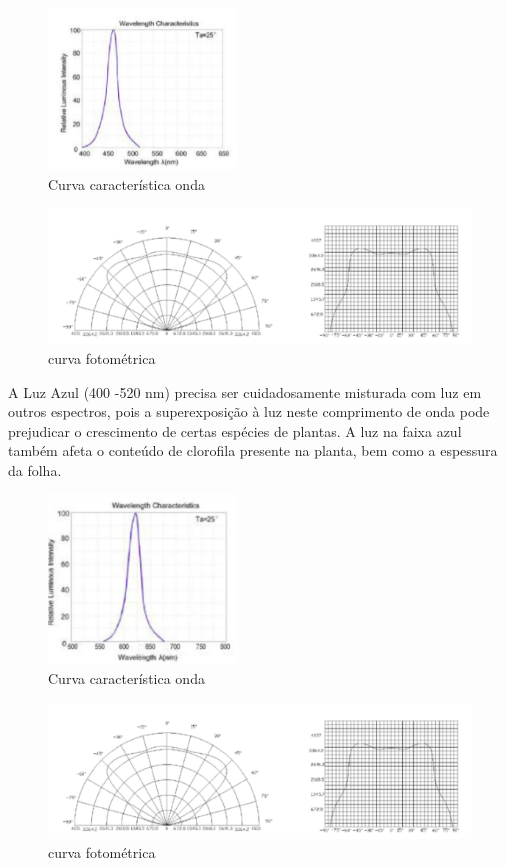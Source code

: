 \begin{figure}[H]
	\centering
	\includegraphics[width=5cm]{figuras/curva400-500.png}
	\caption{Curva característica onda} \label{curva característica 400 500}
\end{figure}

\begin{figure}[H]
	\centering
	\includegraphics[width=15cm]{figuras/curva_fotometrica.png}
	\caption{curva fotométrica} \label{curva fotometrica}
\end{figure}

A Luz Azul (400 -520 nm) precisa ser cuidadosamente misturada com luz em outros espectros, pois a superexposição à luz neste comprimento de onda pode prejudicar o crescimento de certas espécies de plantas. A luz na faixa azul também afeta o conteúdo de clorofila presente na planta, bem como a espessura da folha.

\begin{figure}[H]
	\centering
	\includegraphics[width=5cm]{figuras/curva500-700.png}
	\caption{Curva característica onda} \label{curva característica 500 700}
\end{figure}

\begin{figure}[H]
	\centering
	\includegraphics[width=15cm]{figuras/curva_fotometrica.png}
	\caption{curva fotométrica} \label{curva fotometrica}
\end{figure}


